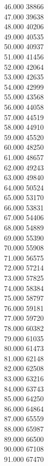 { 46.000	38866 \\
 47.000	39638 \\
 48.000	40206 \\
 49.000	40535 \\
 50.000	40937 \\
 51.000	41456 \\
 52.000	42064 \\
 53.000	42635 \\
 54.000	42999 \\
 55.000	43568 \\
 56.000	44058 \\
 57.000	44519 \\
 58.000	44910 \\
 59.000	45520 \\
 60.000	48250 \\
 61.000	48657 \\
 62.000	49243 \\
 63.000	49840 \\
 64.000	50524 \\
 65.000	53170 \\
 66.000	53831 \\
 67.000	54406 \\
 68.000	54889 \\
 69.000	55390 \\
 70.000	55908 \\
 71.000	56575 \\
 72.000	57214 \\
 73.000	57825 \\
 74.000	58384 \\
 75.000	58797 \\
 76.000	59181 \\
 77.000	59720 \\
 78.000	60382 \\
 79.000	61035 \\
 80.000	61473 \\
 81.000	62148 \\
 82.000	62508 \\
 83.000	63216 \\
 84.000	63743 \\
 85.000	64250 \\
 86.000	64864 \\
 87.000	65559 \\
 88.000	65987 \\
 89.000	66500 \\
 90.000	67108 \\
 91.000	67470 \\
}
